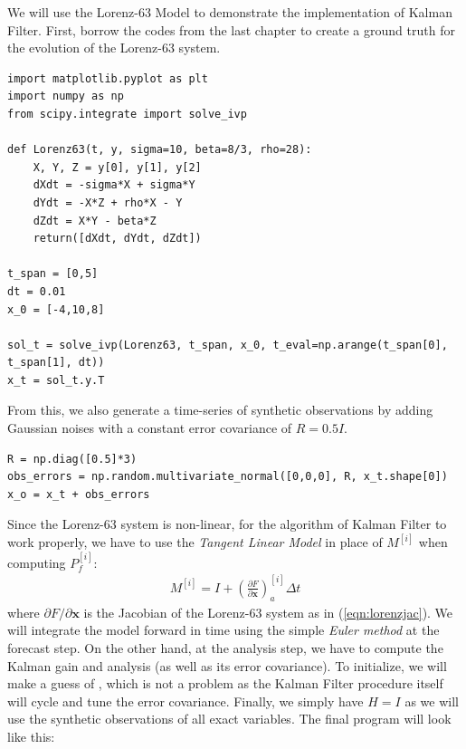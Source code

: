 We will use the Lorenz-63 Model to demonstrate the implementation of Kalman Filter. First, borrow the codes from the last chapter to create a ground truth for the evolution of the Lorenz-63 system.
\begin{lstlisting}
import matplotlib.pyplot as plt
import numpy as np
from scipy.integrate import solve_ivp

def Lorenz63(t, y, sigma=10, beta=8/3, rho=28):
    X, Y, Z = y[0], y[1], y[2]
    dXdt = -sigma*X + sigma*Y
    dYdt = -X*Z + rho*X - Y
    dZdt = X*Y - beta*Z
    return([dXdt, dYdt, dZdt])

t_span = [0,5]
dt = 0.01
x_0 = [-4,10,8]

sol_t = solve_ivp(Lorenz63, t_span, x_0, t_eval=np.arange(t_span[0], t_span[1], dt))
x_t = sol_t.y.T
\end{lstlisting}
From this, we also generate a time-series of synthetic observations by adding Gaussian noises with a constant error covariance of $R = 0.5I$.
\begin{lstlisting}
R = np.diag([0.5]*3)
obs_errors = np.random.multivariate_normal([0,0,0], R, x_t.shape[0])
x_o = x_t + obs_errors    
\end{lstlisting}
Since the Lorenz-63 system is non-linear, for the algorithm of Kalman Filter to work properly, we have to use the \textit{Tangent Linear Model} in place of $M^{[i]}$ when computing $P_f^{[i]}$:
\begin{align}
M^{[i]} = I + (\frac{\partial F}{\partial \textbf{x}})_a^{[i]} \Delta t
\end{align}
where $\partial F/\partial \textbf{x}$ is the Jacobian of the Lorenz-63 system as in (\ref{eqn:lorenzjac}). We will integrate the model forward in time using the simple \textit{Euler method} at the forecast step. On the other hand, at the analysis step, we have to compute the Kalman gain and analysis (as well as its error covariance). To initialize, we will make a guess of , which is not a problem as the Kalman Filter procedure itself will cycle and tune the error covariance. Finally, we simply have $H = I$ as we will use the synthetic observations of all exact variables. The final program will look like this:
